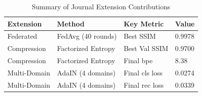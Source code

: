 \begin{table}[t]
\centering
\caption{Summary of Journal Extension Contributions}
\label{tab:extensions}
\begin{tabular}{llll}
\toprule
Extension & Method & Key Metric & Value \\
\midrule
Federated & FedAvg (40 rounds) & Best SSIM & 0.9978 \\
Compression & Factorized Entropy & Best Val SSIM & 0.9700 \\
Compression & Factorized Entropy & Final bpe & 8.38 \\
Multi-Domain & AdaIN (4 domains) & Final cls loss & 0.0274 \\
Multi-Domain & AdaIN (4 domains) & Final rec loss & 0.0339 \\
\bottomrule
\end{tabular}
\end{table}
